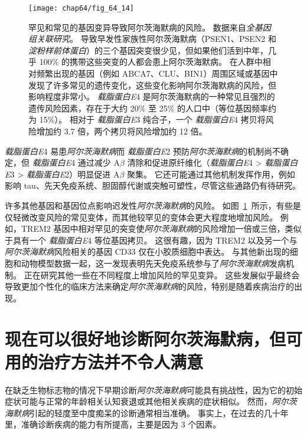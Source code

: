 \begin{figure}[htbp]
	\centering
	\texttt{[image: chap64/fig\_64\_14]}
	\caption{罕见和常见的基因变异导致阿尔茨海默病的风险。
		数据来自\textit{全基因组关联研究}。
		导致早发性家族性阿尔茨海默病（PSEN1、PSEN2 和 \textit{淀粉样前体蛋白}）的三个基因突变很少见，但如果他们活到中年，几乎 100\% 的携带这些突变的人都会患上阿尔茨海默病。
		在人群中相对频繁出现的基因（例如 ABCA7、CLU、BIN1）周围区域或基因中发现了许多常见的遗传变化，这些变化影响阿尔茨海默病的风险，但影响程度非常小。
		\textit{载脂蛋白E}4 是阿尔茨海默病的一种常见且强烈的遗传风险因素，存在于大约 20\% 至 25\% 的人口中（等位基因频率约为 15\%）。
		相对于 \textit{载脂蛋白E}3 纯合子，一个 \textit{载脂蛋白E}4 拷贝将风险增加约 3.7 倍，两个拷贝将风险增加约 12 倍\cite{karch2015alzheimer}。}
	\label{fig:64_14}
\end{figure}


\textit{载脂蛋白E}4 易患\textit{阿尔茨海默病}而 \textit{载脂蛋白E}2 预防\textit{阿尔茨海默病}的机制尚不确定，但 \textit{载脂蛋白E}4 通过减少 A$\beta$ 清除和促进原纤维化（\textit{载脂蛋白E}4 > \textit{载脂蛋白E}3 > \textit{载脂蛋白E}2）明显促进 A$\beta$ 聚集。
它还可能通过其他机制发挥作用，例如影响 tau、先天免疫系统、胆固醇代谢或突触可塑性，尽管这些通路仍有待研究。


许多其他基因和基因位点影响迟发性\textit{阿尔茨海默病}的风险。
如图~\ref{fig:64_14}~所示，有些是仅轻微改变风险的常见变体，而其他较罕见的变体会更大程度地增加风险。
例如，TREM2 基因中相对罕见的突变使\textit{阿尔茨海默病}的风险增加一倍或三倍，类似于具有一个 \textit{载脂蛋白E}4 等位基因拷贝。
这很有趣，因为 TREM2 以及另一个与\textit{阿尔茨海默病}风险相关的基因 CD33 仅在小胶质细胞中表达。
与其他新出现的细胞和动物模型数据一起，这一发现表明先天免疫系统参与了\textit{阿尔茨海默病}发病机制。
正在研究其他一些在不同程度上增加风险的罕见变异。
这些发展似乎最终会导致更加个性化的临床方法来确定\textit{阿尔茨海默病}的风险，特别是随着疾病治疗的出现。



\section{现在可以很好地诊断阿尔茨海默病，但可用的治疗方法并不令人满意}

在缺乏生物标志物的情况下早期诊断\textit{阿尔茨海默病}可能具有挑战性，因为它的初始症状可能与正常的年龄相关认知衰退或其他相关疾病的症状相似。
然而，\textit{阿尔茨海默病}引起的轻度至中度痴呆的诊断通常相当准确。
事实上，在过去的几十年里，准确诊断疾病的能力有所提高，主要是因为 3 个因素。


